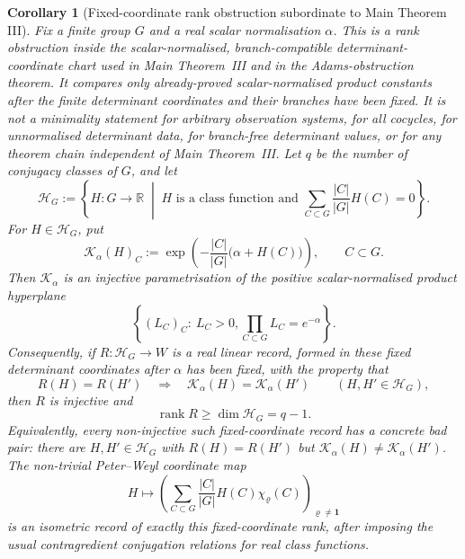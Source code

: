 \documentclass[11pt,a4paper]{amsart}
\theoremstyle{plain}
\newtheorem{corollary}[theorem]{Corollary}
\theoremstyle{definition}
\theoremstyle{remark}
\newcommand{\RR}{\mathbb{R}}
\begin{document}
\begin{corollary}[Fixed-coordinate rank obstruction subordinate to Main Theorem III]
  \label{thm:class-product-minimal-obstruction-skeleton}
  \label{cor:class-product-minimal-obstruction-skeleton}
  Fix a finite group \(G\) and a real scalar normalisation \(\alpha\).  This
  is a rank obstruction inside the scalar-normalised, branch-compatible
  determinant-coordinate chart used in Main Theorem~III and in the
  Adams-obstruction theorem.  It compares only already-proved
  scalar-normalised product constants after the finite determinant
  coordinates and their branches have been fixed.  It is not a minimality
  statement for arbitrary observation systems, for all cocycles, for
  unnormalised determinant data, for branch-free determinant values, or for
  any theorem chain independent of Main Theorem~III.  Let
  \(q\) be the number of conjugacy classes of \(G\), and let
  \[
    \mathcal H_G:=
    \left\{H:G\to\RR\;\middle|\;
      H\text{ is a class function and }
      \sum_{C\subset G}\frac{|C|}{|G|}H(C)=0
    \right\}.
  \]
  For \(H\in\mathcal H_G\), put
  \begin{equation}\label{eq:minimal-skeleton-product-map}
    \mathcal K_\alpha(H)_C:=
    \exp\!\left(-\frac{|C|}{|G|}\bigl(\alpha+H(C)\bigr)\right),
    \qquad C\subset G .
  \end{equation}
  Then \(\mathcal K_\alpha\) is an injective parametrisation of the positive
  scalar-normalised product hyperplane
  \[
    \left\{(L_C)_C:\ L_C>0,
      \prod_{C\subset G}L_C=e^{-\alpha}\right\}.
  \]
  Consequently, if \(R:\mathcal H_G\to W\) is a real linear record, formed in
  these fixed determinant coordinates after \(\alpha\) has been fixed, with
  the property that
  \[
    R(H)=R(H')\quad\Longrightarrow\quad
    \mathcal K_\alpha(H)=\mathcal K_\alpha(H')
    \qquad(H,H'\in\mathcal H_G),
  \]
  then \(R\) is injective and
  \begin{equation}\label{eq:minimal-skeleton-rank-bound}
    \operatorname{rank}R\ge \dim\mathcal H_G=q-1 .
  \end{equation}
  Equivalently, every non-injective such fixed-coordinate record has a
  concrete bad pair: there are \(H,H'\in\mathcal H_G\) with
  \(R(H)=R(H')\) but
  \(\mathcal K_\alpha(H)\ne\mathcal K_\alpha(H')\).  The non-trivial
  Peter--Weyl coordinate map
  \begin{equation}\label{eq:minimal-skeleton-peter-weyl-record}
    H\longmapsto
    \left(
      \sum_{C\subset G}\frac{|C|}{|G|}H(C)\chi_\varrho(C)
    \right)_{\varrho\ne\mathbf1}
  \end{equation}
  is an isometric record of exactly this fixed-coordinate rank, after
  imposing the usual contragredient conjugation relations for real class
  functions.


\end{corollary}
\end{document}

